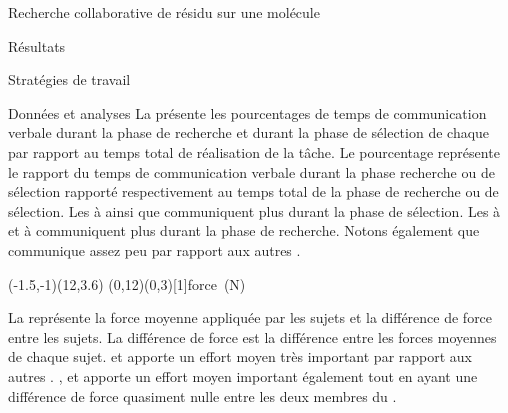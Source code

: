 \documentclass[myfrancais,ngerman,english,french]{mythesis}
\begin{document}
\begin{mychapter}{Recherche collaborative de résidu sur une molécule}
\begin{mysection}{Résultats}
\begin{mysubsection}{Stratégies de travail}
\begin{mysubsubsection}{Données et analyses}
					La  présente les pourcentages de temps de communication verbale durant la phase de recherche et durant la phase de sélection de chaque  par rapport au temps total de réalisation de la tâche.
					Le pourcentage représente le rapport du temps de communication verbale durant la phase recherche ou de sélection rapporté respectivement au temps total de la phase de recherche ou de sélection.
					Les   à  ainsi que  communiquent plus durant la phase de sélection.
					Les   à  et  à  communiquent plus durant la phase de recherche.
					Notons également que  communique assez peu par rapport aux autres .

					\begin{myfigure}
						\begin{myps}(-1.5,-1)(12,3.6)
							\myaxes(0,12){}(0,3)[1]{force~(N)}
						\end{myps}
					\end{myfigure}

					La  représente la force moyenne appliquée par les sujets  et la différence de force entre les sujets.
					La différence de force est la différence entre les forces moyennes de chaque sujet.
					 et  apporte un effort moyen très important par rapport aux autres .
					,  et  apporte un effort moyen important également tout en ayant une différence de force quasiment nulle entre les deux membres du .


\end{mysubsubsection}
\end{mysubsection}
\end{mysection}
\end{mychapter}
\end{document}
